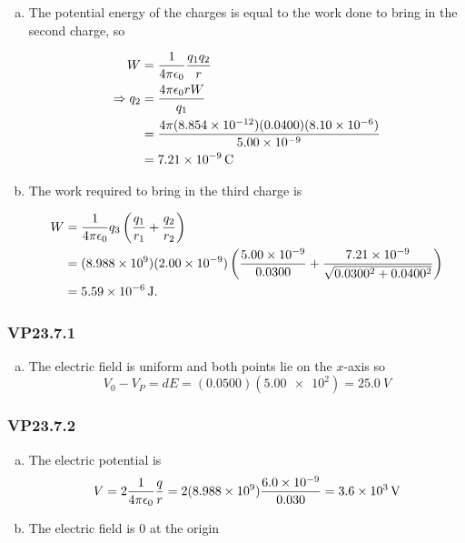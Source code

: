 \documentclass{article}
\begin{document}
\begin{enumerate}[a)]
  \item The potential energy of the charges is equal to the work done to bring in the second charge, so

        \begin{align*}
          W               & = \frac{1}{4 \pi \epsilon_0} \frac{q_1 q_2}{r}                                                \\
          \Rightarrow q_2 & = \frac{4 \pi \epsilon_0 r W}{q_1}                                     \\
                          & = \frac{4 \pi (\num{8.854e-12})(0.0400)(\num{8.10e-6})}{\num{5.00e-9}} \\
                          & = \qty{7.21e-9}{C}
        \end{align*}

  \item The work required to bring in the third charge is

        \begin{align*}
          W & = \frac{1}{4 \pi \epsilon_0} q_3 \left( \frac{q_1}{r_1} + \frac{q_2}{r_2} \right)                                                                       \\
            & = (\num{8.988e9}) (\num{2.00e-9}) \left( \frac{\num{5.00e-9}}{0.0300} + \frac{\num{7.21e-9}}{\sqrt{0.0300^2 + 0.0400^2}} \right) \\
            & = \qty{5.59e-6}{J}.
        \end{align*}
\end{enumerate}

\subsubsection{VP23.7.1}

\begin{enumerate}[a)]
  \item The electric field is uniform and both points lie on the $x$-axis so \[V_0 - V_P = d E = (0.0500) (\num{5.00e2}) = \qty{25.0}{V}\]
\end{enumerate}

\subsubsection{VP23.7.2}

\begin{enumerate}[a)]
  \item The electric potential is \[V = 2 \frac{1}{4 \pi \epsilon_0} \frac{q}{r} = 2 (\num{8.988e9}) \frac{\num{6.0e-9}}{0.030} = \qty{3.6e3}{V}\]

        \setcounter{enumi}{3}
  \item The electric field is 0 at the origin
\end{enumerate}
\end{document}
